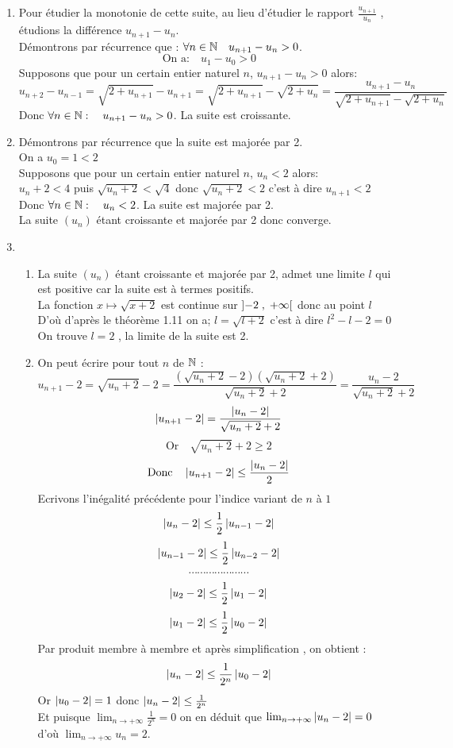 \begin{enumerate}
\item Pour étudier la monotonie de cette suite, au lieu d'étudier le rapport $ \frac{u_{n+1}}{u_{n}} $ , étudions la différence $ u_{n+1}-u_{n} $.\\
Démontrons par récurrence que : $ \forall n\in\mathbb{N}\quad u_{n+1}-u_{n}>0 $. 
\[  \textrm{On a:} \quad u_{1}-u_{0}>0\]
Supposons que pour un certain entier naturel $ n $, $u_{n+1}-u_{n}>0 $ alors:
\[u_{n+2}-u_{n-1}=\sqrt{2+u_{n+1}}-u_{n+1}= \sqrt{2+u_{n+1}}-\sqrt{2+u_{n}}=\frac{u_{n+1}-u_{n}}{ \sqrt{2+u_{n+1}}-\sqrt{2+u_{n}}}\]
Donc $ \forall n\in\mathbb{N}:\quad u_{n+1}-u_{n}>0 $. La suite est croissante.
\item Démontrons par récurrence que la suite est majorée par 2.\\
On a $ u_{0}=1<2 $\\
Supposons que pour un certain entier naturel $ n $, $u_{n}<2 $ alors:\\
$ u_{n}+2<4 $ puis $ \sqrt{u_{n}+2}<\sqrt{4} $ donc $ \sqrt{u_{n}+2}<2 $ c'est à dire $ u_{n+1}<2 $\\
Donc $ \forall n\in\mathbb{N}:\quad u_{n}<2 $. La suite est majorée par 2.\\
La suite $ (u_{n}) $ étant croissante et majorée par 2 donc converge.
\item
\begin{enumerate}
\item La suite $ (u_{n}) $ étant croissante et majorée par 2, admet une limite $ l $ qui est positive car la suite est à termes positifs.\\
La fonction $ x\mapsto \sqrt{x+2}$ est continue sur $ \left]-2 \;,\; +\infty\right[$ donc au point $l$\\
D'où d'après le théorème 1.11 on a; $ l=\sqrt{l+2}  $ c'est à dire $ l^{2}-l-2 =0 $\\
On trouve $ l=2 $ , la limite de la suite est 2.
\item On peut écrire pour tout $ n $ de $ \mathbb{N} $ :
\[u_{n+1} -2=\sqrt{u_{n}+2}-2=\frac{(\sqrt{u_{n}+2}-2)(\sqrt{u_{n}+2}+2)}{\sqrt{u_{n}+2}+2}=\frac{u_{n}-2}{\sqrt{u_{n}+2}+2}\]
\[  \left\lvert u_{n+1} -2 \right\rvert=\frac{\left\lvert u_{n}-2 \right\rvert}{\sqrt{u_{n}+2}+2}\]
\[\textrm{Or} \quad \sqrt{u_{n}+2}+2\geq 2 \]
\[ \textrm{Donc} \quad\left\lvert u_{n+1} -2 \right\rvert\leq\frac{\left\lvert u_{n}-2 \right\rvert}{2}\]
Ecrivons l'inégalité précédente  pour l'indice variant de $ n$ à $1 $
\[ \left\lvert u_{n} -2 \right\rvert\leq\frac{1}{2}\left\lvert u_{n-1}-2 \right\rvert\]
\[ \left\lvert u_{n-1} -2 \right\rvert\leq\frac{1}{2}\left\lvert u_{n-2}-2 \right\rvert\]
\[\cdots\cdots\cdots\cdots\cdots\cdots\cdots \]
\[ \left\lvert u_{2} -2 \right\rvert\leq\frac{1}{2}\left\lvert u_{1}-2 \right\rvert\]
\[\left\lvert u_{1} -2 \right\rvert\leq\frac{1}{2}\left\lvert u_{0}-2 \right\rvert\]
Par produit membre à membre et après simplification , on obtient : 
\[ \left\lvert u_{n} -2 \right\rvert\leq\frac{1}{2^{n}}\left\lvert u_{0}-2 \right\rvert\]
Or $ \left\lvert u_{0}-2 \right\rvert=1 $ donc $ \left\lvert u_{n} -2 \right\rvert\leq\frac{1}{2^{n}} $\\
Et puisque $\lim_{n \to  +\infty} \frac{1}{2^{n}}= 0$ on en déduit que $\lim_{n \to  +\infty} \left\lvert u_{n}-2 \right\rvert=0$ \\
 d'où $\lim_{n \to  +\infty}u_{n}=2$.

\end{enumerate}
\end{enumerate}

